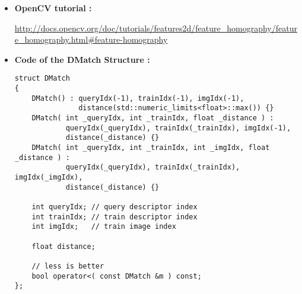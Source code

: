 \documentclass[english,a4paper,11pt]{report}
\begin{document}
	\begin{itemize}
	\item
		\hypertarget{opencv}{\textbf{OpenCV tutorial :\\}}	\url{http://docs.opencv.org/doc/tutorials/features2d/feature_homography/feature_homography.html#feature-homography}\\

	\item
	\hypertarget{structDMatch}{\textbf{Code of the DMatch Structure :}}
	\begin{lstlisting}
struct DMatch
{
    DMatch() : queryIdx(-1), trainIdx(-1), imgIdx(-1),
               distance(std::numeric_limits<float>::max()) {}
    DMatch( int _queryIdx, int _trainIdx, float _distance ) :
            queryIdx(_queryIdx), trainIdx(_trainIdx), imgIdx(-1),
            distance(_distance) {}
    DMatch( int _queryIdx, int _trainIdx, int _imgIdx, float _distance ) :
            queryIdx(_queryIdx), trainIdx(_trainIdx), imgIdx(_imgIdx),
            distance(_distance) {}

    int queryIdx; // query descriptor index
    int trainIdx; // train descriptor index
    int imgIdx;   // train image index

    float distance;

    // less is better
    bool operator<( const DMatch &m ) const;
};
	\end{lstlisting}	
	
\end{itemize}		
	


	\listoffigures
		
	
	
	
	

	
	
	
\end{document}
